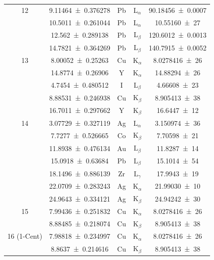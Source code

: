 \documentclass[
	a4paper,
	12pt,
	pagesize,
	ngerman
]{scrartcl}
\begin{document}
\begin{table}[H]
{\begin{tabular}{ c | c || c | c | c }
			12 
			& \SI{9.11464+-0.376278}{} &Pb &L$_\alpha$&  \SI{9 .18456(70)    }{} \\ 
			& \SI{10.5011+-0.261044}{} &Pb &L$_\alpha$&  \SI{10. 55160(27)     }{} \\
			& \SI{12.562+-0.289138}{} &Pb &L$_\beta$&  \SI{ 12 .6012(13)     }{} \\
			& \SI{14.7821+-0.364269}{} &Pb &L$_\beta$&  \SI{  14 .7915(52)    }{} \\
			\hline
			
			13 & \SI{8.00052+-0.25263}{} & Cu & $\text{K}_\alpha$ &  \SI{8,0278416(26)}{}\\
			& \SI{14.8774+-0.26906}{} & Y & $\text{K}_\alpha$ & \SI{14,88294(26)}{} \\
			& \SI{4.7454+-0.480512}{} & I & $\text{L}_\beta$ & \SI{4,66608(23)}{} \\
			& \SI{8.88531+-0.246938}{} & Cu &  $\text{K}_\beta$ & \SI{8,905413(38)}{}\\
			& \SI{16.7011+-0.297662}{} & Y & $\text{K}_\beta$ &  \SI{16,6447(12)}{} \\ \hline
			
			14 & \SI{3.07729+-0.327119}{} &Ag &  $\text{L}_\alpha$ &  \SI{3,150974(36) }{} \\
			& \SI{7.7277+-0.526665}{} & Co & $\text{K}_\beta$ &  \SI{7,70598(21)}{} \\
			& \SI{11.8938+-0.476134}{} & Au & $\text{L}_\beta $ & \SI{11,8287(14) }{} \\
			& \SI{15.0918+-0.63684}{} & Pb & $\text{L}_\beta $ &  \SI{15,1014(54)}{} \\
			& \SI{18.1496+-0.886139}{} & Zr & $\text{L}_\gamma $ &  \SI{17,9943(19)}{} \\
			& \SI{22.0709+-0.283243}{} &Ag & $\text{K}_\alpha$ &  \SI{21,99030(10)}{} \\
			& \SI{24.9643+-0.334121}{} &Ag & $\text{K}_\beta$ &  \SI{24,94242(30)}{} \\ \hline
			
			15 & \SI{7.99436+-0.251832}{} & Cu & $\text{K}_\alpha$ &  \SI{8,0278416(26)}{} \\
			& \SI{8.88485+-0.218074}{} &  Cu &  $\text{K}_\beta$ & \SI{8,905413(38)}{} \\ \hline
			
			16 (1-Cent)& \SI{7.98818+-0.234997}{} & Cu & $\text{K}_\alpha$ &  \SI{8,0278416(26)}{} \\
			& \SI{8.8637+-0.214616}{} & Cu &  $\text{K}_\beta$ & \SI{8,905413(38)}{} \\ \hline
			

\end{tabular}}
\end{table}
\end{document}

